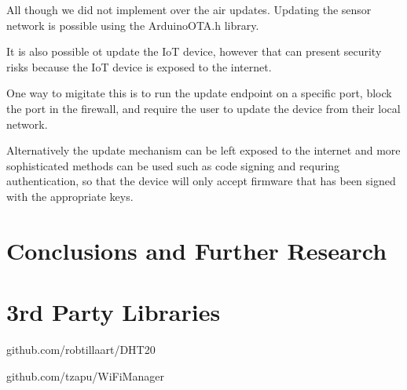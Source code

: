 \documentclass[10pt, journal]{IEEEtran} %
\begin{document}
All though we did not implement over the air updates.
Updating the sensor network is possible using the ArduinoOTA.h library.

It is also possible ot update the IoT device, however that can present security risks
because the IoT device is exposed to the internet.

One way to migitate this is to run the update endpoint on a specific port,
block the port in the firewall,
and require the user to update the device from their local network.

Alternatively the update mechanism can be left exposed to the internet
and more sophisticated methods can be used such as code signing and requring authentication,
so that the device will only accept firmware that has been signed with the appropriate keys.


\section{Conclusions and Further Research}





\section{3rd Party Libraries}
github.com/robtillaart/DHT20

github.com/tzapu/WiFiManager



    
    

%         
    

\end{document}
